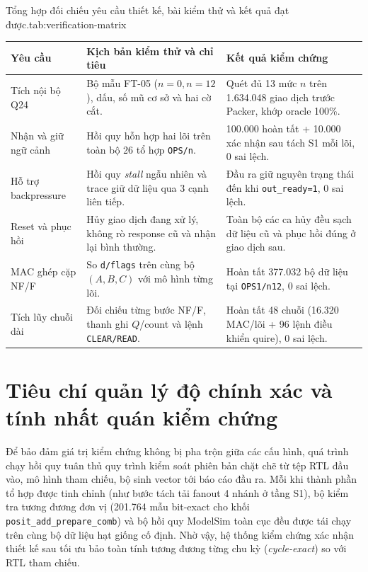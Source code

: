 \begin{engineeringtable}{Tổng hợp đối chiếu yêu cầu thiết kế, bài kiểm thử và kết quả đạt được.}{tab:verification-matrix}
\begin{tabularx}{\linewidth}{@{}>{\raggedright\arraybackslash}p{28mm}Y Y@{}}
\toprule
Yêu cầu & Kịch bản kiểm thử và chỉ tiêu & Kết quả kiểm chứng \\
\midrule
Tích nội bộ Q24 & Bộ mẫu FT-05 ($n=0, n=12$), dấu, số mũ cơ sở và hai cờ cắt. &
Quét đủ 13 mức $n$ trên 1.634.048 giao dịch trước Packer, khớp oracle 100\%. \\
Nhận và giữ ngữ cảnh & Hồi quy hỗn hợp hai lõi trên toàn bộ 26 tổ hợp \texttt{OPS/n}. &
100.000 hoàn tất + 10.000 xác nhận sau tách S1 mỗi lõi, $0$ sai lệch. \\
Hỗ trợ backpressure & Hồi quy \textit{stall} ngẫu nhiên và trace giữ dữ liệu qua 3 cạnh liên tiếp. &
Đầu ra giữ nguyên trạng thái đến khi \texttt{out\_ready=1}, $0$ sai lệch. \\
Reset và phục hồi & Hủy giao dịch đang xử lý, không rò response cũ và nhận lại bình thường. &
Toàn bộ các ca hủy đều sạch dữ liệu cũ và phục hồi đúng ở giao dịch sau. \\
MAC ghép cặp NF/F & So \texttt{d/flags} trên cùng bộ $(A,B,C)$ với mô hình từng lõi. &
Hoàn tất 377.032 bộ dữ liệu tại \texttt{OPS1/n12}, $0$ sai lệch. \\
Tích lũy chuỗi dài & Đối chiếu từng bước NF/F, thanh ghi $Q$/count và lệnh \texttt{CLEAR/READ}. &
Hoàn tất 48 chuỗi (16.320 MAC/lõi + 96 lệnh điều khiển quire), $0$ sai lệch. \\
\bottomrule
\end{tabularx}
\end{engineeringtable}

\section{Tiêu chí quản lý độ chính xác và tính nhất quán kiểm chứng}

Để bảo đảm giá trị kiểm chứng không bị pha trộn giữa các cấu hình, quá trình
chạy hồi quy tuân thủ quy trình kiểm soát phiên bản chặt chẽ từ tệp RTL đầu vào,
mô hình tham chiếu, bộ sinh vector tới báo cáo đầu ra. Mỗi khi thành phần tổ
hợp được tinh chỉnh (như bước tách tải fanout 4 nhánh ở tầng S1), bộ kiểm tra
tương đương đơn vị (201.764 mẫu bit-exact cho khối \texttt{posit\_add\_prepare\_comb})
và bộ hồi quy ModelSim toàn cục đều được tái chạy trên cùng bộ dữ liệu hạt giống
cố định. Nhờ vậy, hệ thống kiểm chứng xác nhận thiết kế sau tối ưu bảo toàn tính
tương đương từng chu kỳ (\textit{cycle-exact}) so với RTL tham chiếu.


